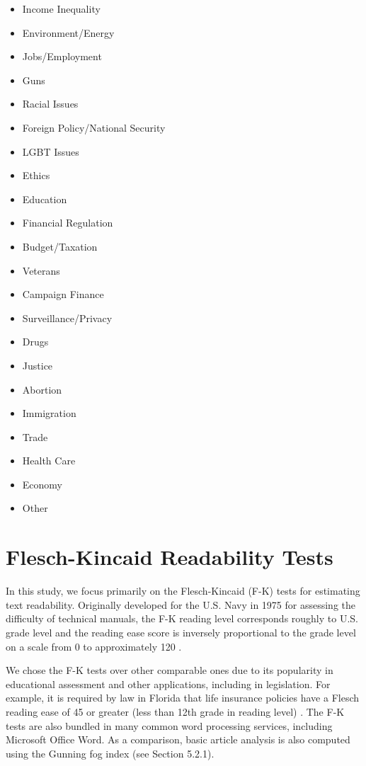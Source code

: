 \begin{multicols}{3}
    \begin{itemize}
      \item Income Inequality
      \item Environment/Energy
      \item Jobs/Employment
      \item Guns
      \item Racial Issues
      \item Foreign Policy/National Security
      \item LGBT Issues
      \item Ethics
      \item Education
      \item Financial Regulation
      \item Budget/Taxation
      \item Veterans
      \item Campaign Finance
      \item Surveillance/Privacy
      \item Drugs
      \item Justice
      \item Abortion
      \item Immigration
      \item Trade
      \item Health Care
      \item Economy
      \item Other 
    \end{itemize}
\end{multicols}
 


\section{Flesch-Kincaid Readability Tests} 
In this study, we focus primarily on the Flesch-Kincaid (F-K) tests for estimating text readability. Originally developed for the U.S. Navy in 1975 for assessing the difficulty of technical manuals, the F-K reading level corresponds roughly to U.S. grade level and the reading ease score is inversely proportional to the grade level on a scale from 0 to approximately 120 \cite{kincaid1975derivation}.

We chose the F-K tests over other comparable ones due to its popularity in educational assessment and other applications, including in legislation. For example, it is required by law in Florida that life insurance policies have a Flesch reading ease of 45 or greater (less than 12th grade in reading level) \cite{Statu37online}. The F-K tests are also bundled in many common word processing services, including Microsoft Office Word. As a comparison, basic article analysis is also computed using the Gunning fog index (see Section 5.2.1).

